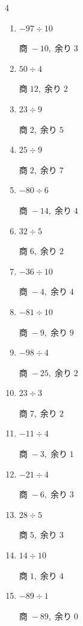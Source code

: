 \begin{multicols}{4}
\begin{enumerate}
  \item $-97 \div 10$

        $商\; -10,\; 余り\; 3$

\columnbreak %

  \item $50 \div 4$

        $商\; 12,\; 余り\; 2$

  \item $23 \div 9$

        $商\; 2,\; 余り\; 5$

  \item $25 \div 9$

        $商\; 2,\; 余り\; 7$

  \item $-80 \div 6$

        $商\; -14,\; 余り\; 4$

  \item $32 \div 5$

        $商\; 6,\; 余り\; 2$

  \item $-36 \div 10$

        $商\; -4,\; 余り\; 4$

  \item $-81 \div 10$

        $商\; -9,\; 余り\; 9$

  \item $-98 \div 4$

        $商\; -25,\; 余り\; 2$

  \item $23 \div 3$

        $商\; 7,\; 余り\; 2$

  \item $-11 \div 4$

        $商\; -3,\; 余り\; 1$

  \item $-21 \div 4$

        $商\; -6,\; 余り\; 3$

  \item $28 \div 5$

        $商\; 5,\; 余り\; 3$

  \item $14 \div 10$

        $商\; 1,\; 余り\; 4$

  \item $-89 \div 1$

        $商\; -89,\; 余り\; 0$


\end{enumerate}
\end{multicols}
